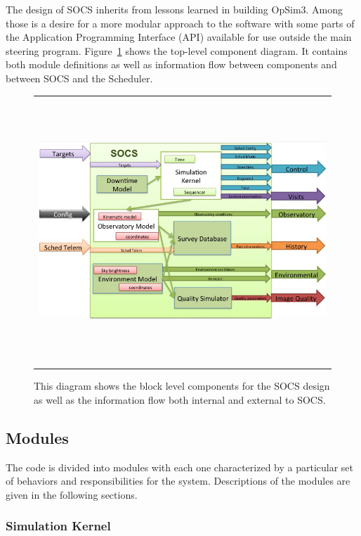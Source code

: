\documentclass[]{spie}  %
\begin{document}
The design of SOCS inherits from lessons learned in building OpSim3. Among those is a desire for a more modular approach to the software with some parts of the Application Programming Interface (API) available for use outside the main steering program. Figure~\ref{fig:comparch} shows the top-level component diagram. It contains both module definitions as well as information flow between components and between SOCS and the Scheduler.

\begin{figure} [ht]
\begin{center}
\begin{tabular}{c}
\includegraphics[height=10cm]{CompArch.png}
\end{tabular}
\end{center}
\caption[example]
{ \label{fig:comparch} 
This diagram shows the block level components for the SOCS design as well as the information flow both internal and external to SOCS.}
\end{figure}

\subsection{Modules}

The code is divided into modules with each one characterized by a particular set of behaviors and responsibilities for the system. Descriptions of the modules are given in the following sections.

\subsubsection{Simulation Kernel}
\end{document}
